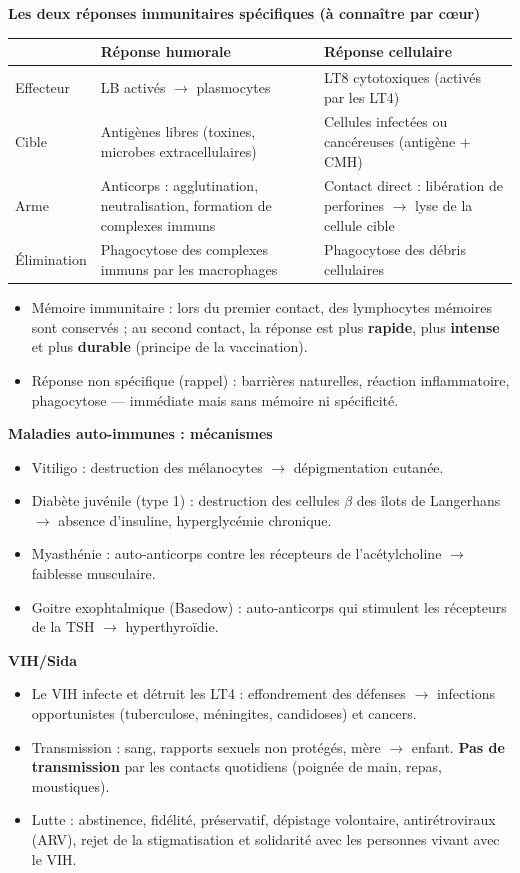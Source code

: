 \documentclass[11pt]{article}
\newcommand{\cle}[1]{{\popxbold\color{popdark}#1}}
\begin{document}
\begin{bilan}
\textbf{Les deux réponses immunitaires spécifiques (à connaître par cœur)}
\begin{center}
\begin{tabularx}{\linewidth}{|l|X|X|}
\hline
\rowcolor{popblueL} & \textbf{Réponse humorale} & \textbf{Réponse cellulaire} \\
\hline
Effecteur & LB activés $\to$ plasmocytes & LT8 cytotoxiques (activés par les LT4) \\
\hline
Cible & Antigènes libres (toxines, microbes extracellulaires) & Cellules infectées ou cancéreuses (antigène + CMH) \\
\hline
Arme & Anticorps : agglutination, neutralisation, formation de complexes immuns & Contact direct : libération de perforines $\to$ lyse de la cellule cible \\
\hline
Élimination & Phagocytose des complexes immuns par les macrophages & Phagocytose des débris cellulaires \\
\hline
\end{tabularx}
\end{center}
\begin{itemize}
  \item \cle{Mémoire immunitaire} : lors du premier contact, des lymphocytes mémoires sont conservés ; au second contact, la réponse est plus \textbf{rapide}, plus \textbf{intense} et plus \textbf{durable} (principe de la vaccination).
  \item Réponse non spécifique (rappel) : barrières naturelles, réaction inflammatoire, phagocytose — immédiate mais sans mémoire ni spécificité.
\end{itemize}

\textbf{Maladies auto-immunes : mécanismes}
\begin{itemize}
  \item \cle{Vitiligo} : destruction des mélanocytes $\to$ dépigmentation cutanée.
  \item \cle{Diabète juvénile} (type 1) : destruction des cellules $\beta$ des îlots de Langerhans $\to$ absence d'insuline, hyperglycémie chronique.
  \item \cle{Myasthénie} : auto-anticorps contre les récepteurs de l'acétylcholine $\to$ faiblesse musculaire.
  \item \cle{Goitre exophtalmique} (Basedow) : auto-anticorps qui stimulent les récepteurs de la TSH $\to$ hyperthyroïdie.
\end{itemize}

\textbf{VIH/Sida}
\begin{itemize}
  \item Le VIH infecte et détruit les \cle{LT4} : effondrement des défenses $\to$ infections opportunistes (tuberculose, méningites, candidoses) et cancers.
  \item Transmission : sang, rapports sexuels non protégés, mère $\to$ enfant. \textbf{Pas de transmission} par les contacts quotidiens (poignée de main, repas, moustiques).
  \item Lutte : abstinence, fidélité, préservatif, dépistage volontaire, antirétroviraux (ARV), rejet de la stigmatisation et solidarité avec les personnes vivant avec le VIH.
\end{itemize}


\end{bilan}
\end{document}
